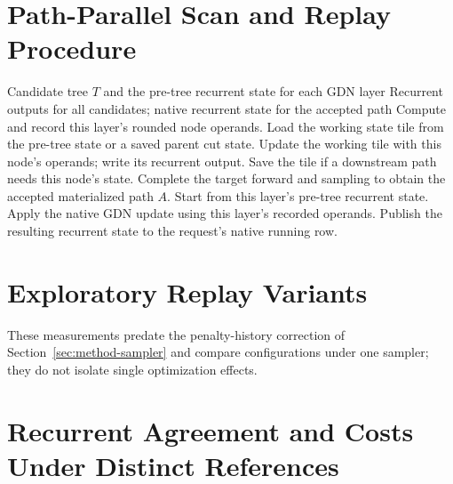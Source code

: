\documentclass[sigconf,anonymous,review]{acmart}
\begin{document}
\section{Path-Parallel Scan and Replay Procedure}
\label{app:scan}
\begin{algorithm}[h]
\caption{Path-parallel scan and accepted-path replay}
\label{alg:scan-replay}
\small
\begin{algorithmic}[1]
\Require Candidate tree $T$ and the pre-tree recurrent state for each GDN layer
\Ensure Recurrent outputs for all candidates; native recurrent state for the accepted path
  \State Compute and record this layer's rounded node operands.
      \State Load the working state tile from the pre-tree state or a saved parent cut state.
        \State Update the working tile with this node's operands; write its recurrent output.
        \State Save the tile if a downstream path needs this node's state.
      \EndFor
    \EndParallelFor
  \EndFor
\EndFor
\State Complete the target forward and sampling to obtain the accepted materialized path $A$.
  \State Start from this layer's pre-tree recurrent state.
    \State Apply the native GDN update using this layer's recorded operands.
  \EndFor
  \State Publish the resulting recurrent state to the request's native running row.
\EndFor
\end{algorithmic}
\end{algorithm}

\section{Exploratory Replay Variants}
\label{app:variants}
These measurements predate the penalty-history correction of Section~\ref{sec:method-sampler} and compare configurations under one sampler; they do not isolate single optimization effects.


\section{Recurrent Agreement and Costs Under Distinct References}
\label{app:recurrent}
\label{sec:m1-qualification}
\label{sec:mechanism-costs}


\end{document}
